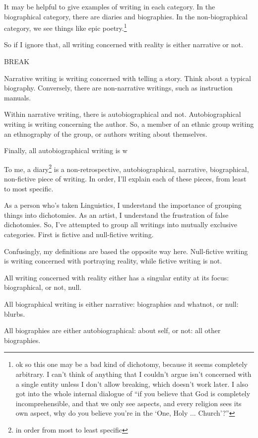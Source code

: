 \documentclass[12pt]{article}[titlepage]
\newcommand{\say}[1]{``#1''}
\newcommand{\nsay}[1]{`#1'}
\newcommand{\1}{\={a}}
\newcommand{\2}{\={e}}
\newcommand{\3}{\={\i}}
\newcommand{\4}{\=o}
\newcommand{\5}{\=u}
\newcommand{\6}{\={A}}
\renewcommand{\,}{\textsuperscript{,}}
\begin{document}
It may be helpful to give examples of writing in each category.
In the biographical category, there are diaries and biographies.
In the non-biographical category, we see things like epic poetry.\footnote{ok so this one may be a bad kind of dichotomy, because it seems completely arbitrary. I can't think of anything that I couldn't argue isn't concerned with a single entity unless I don't allow breaking, which doesn't work later. I also got into the whole internal dialogue of \say{if you believe that God is completely incomprehensible, and that we only see aspects, and every religion sees its own aspect, why do you believe you're in the \nsay{One, Holy ... Church}?}}

So if I ignore that, all writing concerned with reality is either narrative or not.

BREAK

Narrative writing is writing concerned with telling a story.
Think about a typical biography.
Conversely, there are non-narrative writings, such as instruction manuals.

Within narrative writing, there is autobiographical and not.
Autobiographical writing is writing concerning the author.
So, a member of an ethnic group writing an ethnography of the group, or authors writing about themselves.

Finally, all autobiographical writing is w

To me, a diary\footnote{in order from most to least specific} is a non-retrospective, autobiographical, narrative, biographical, non-fictive piece of writing.
In order, I'll explain each of these pieces, from least to most specific.

As a person who's taken Linguistics, I understand the importance of grouping things into dichotomies.
As an artist, I understand the frustration of false dichotomies.
So, I've attempted to group all writings into mutually exclusive categories.
First is fictive and null-fictive writing.

Confusingly, my definitions are based the opposite way here.
Null-fictive writing is writing concerned with portraying reality, while fictive writing is not.

All writing concerned with reality either has a singular entity at its focus: biographical, or not, null.

All biographical writing is either narrative: biographies and whatnot, or null: blurbs.

All biographies are either autobiographical: about self, or not: all other biographies.
\end{document}
